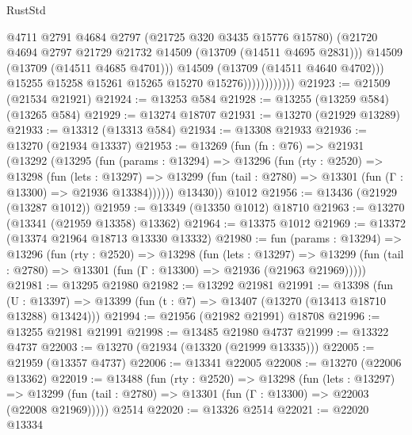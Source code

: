 \begin{lexlean}{RustStd}
\begin{coremodule}
                                @4711
                                @2791
                                @4684
                                @2797
                                (@21725 @320 @3435 @15776 @15780)
                                (@21720
                                  @4694
                                  @2797
                                  @21729
                                  @21732
                                  @14509
                                  (@13709 (@14511 @4695 @2831)))
                                @14509
                                (@13709 (@14511 @4685 @4701)))
                              @14509
                              (@13709 (@14511 @4640 @4702)))
                            @15255
                            @15258
                            @15261
                            @15265
                            @15270
                            @15276))))))))))))
@21923 := @21509 (@21534 @21921)
@21924 := @13253 @584
@21928 := @13255 (@13259 @584) (@13265 @584)
@21929 := @13274 @18707
@21931 := @13270 (@21929 @13289)
@21933 := @13312 (@13313 @584)
@21934 := @13308 @21933
@21936 := @13270 (@21934 @13337)
@21953 := @13269
    (fun (fn : @76) =>
    @21931
      (@13292
        (@13295
          (fun (params : @13294) =>
          @13296
            (fun (rty : @2520) =>
            @13298
              (fun (lets : @13297) =>
              @13299 (fun (tail : @2780) => @13301 (fun (Γ : @13300) => @21936 @13384))))))
        @13430))
    @1012
@21956 := @13436 (@21929 (@13287 @1012))
@21959 := @13349 (@13350 @1012) @18710
@21963 := @13270 (@13341 (@21959 @13358) @13362)
@21964 := @13375 @1012
@21969 := @13372 (@13374 @21964 @18713 @13330 @13332)
@21980 := fun (params : @13294) =>
  @13296
    (fun (rty : @2520) =>
    @13298
      (fun (lets : @13297) =>
      @13299 (fun (tail : @2780) => @13301 (fun (Γ : @13300) => @21936 (@21963 @21969)))))
@21981 := @13295 @21980
@21982 := @13292 @21981
@21991 := @13398
    (fun (U : @13397) => @13399 (fun (t : @7) => @13407 (@13270 (@13413 @18710 @13288) @13424)))
@21994 := @21956 (@21982 @21991) @18708
@21996 := @13255 @21981 @21991
@21998 := @13485 @21980 @4737
@21999 := @13322 @4737
@22003 := @13270 (@21934 (@13320 (@21999 @13335)))
@22005 := @21959 (@13357 @4737)
@22006 := @13341 @22005
@22008 := @13270 (@22006 @13362)
@22019 := @13488
    (fun (rty : @2520) =>
    @13298
      (fun (lets : @13297) =>
      @13299 (fun (tail : @2780) => @13301 (fun (Γ : @13300) => @22003 (@22008 @21969)))))
    @2514
@22020 := @13326 @2514
@22021 := @22020 @13334

\end{coremodule}
\end{lexlean}

